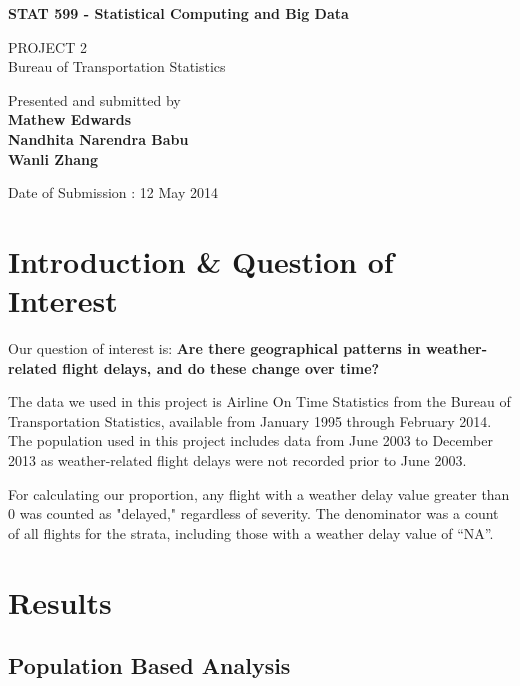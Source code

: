 \documentclass{article}
\begin{document}
\begin{titlepage}
    \begin{center}
        \vspace*{1cm}
        
        \Huge
        \textbf{STAT 599 - Statistical Computing and Big Data}
        
        \vspace{1cm}
        \LARGE
        PROJECT 2\\
        Bureau of Transportation Statistics
        
        \vspace{8cm}
        Presented and submitted by \\
        \textbf{Mathew Edwards} \\
        \textbf{Nandhita Narendra Babu} \\
        \textbf{Wanli Zhang}
        
        \vspace{0.5cm}
        Date of Submission : 12 May 2014
        
       
        
    \end{center}
\end{titlepage}


\section{Introduction \& Question of Interest}
Our question of interest is: \textbf{Are there geographical patterns in weather-related flight delays, and do these change over time?}

The data we used in this project is Airline On Time Statistics from the Bureau of Transportation Statistics, available from January 1995 through February 2014. The population used in this project includes data from June 2003 to December 2013 as weather-related flight delays were not recorded prior to June 2003. 

For calculating our proportion, any flight with a weather delay value greater than 0 was counted as "delayed," regardless of severity. The denominator was a count of all flights for the strata, including those with a weather delay value of ``NA''. 

\section{Results}
\subsection{Population Based Analysis}
\end{document}
